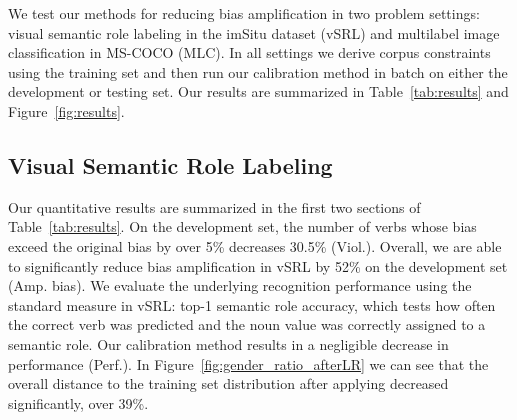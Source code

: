 We test our methods for reducing bias amplification in two problem settings: visual semantic role labeling in the imSitu dataset (vSRL) and multilabel image classification in MS-COCO (MLC). 
In all settings we derive corpus constraints using the training set and then run our calibration method in batch on either the development or testing set. 
Our results are summarized in Table~\ref{tab:results} and Figure~\ref{fig:results}.
\subsection{Visual Semantic Role Labeling}
Our quantitative results are summarized in the first two sections of Table~\ref{tab:results}.
On the development set, the number of verbs whose bias exceed the original bias by over 5\% decreases 30.5\% (Viol.).
Overall, we are able to significantly reduce bias amplification in vSRL by 52\% on the development set (Amp. bias).
We evaluate the underlying recognition performance using the standard measure in vSRL:  top-1 semantic role accuracy, which tests how often the correct verb was predicted and the noun value was correctly assigned to a semantic role.
Our calibration method results in a negligible decrease in performance (Perf.).
In Figure~\ref{fig:gender_ratio_afterLR} we can see that the overall distance to the training set distribution after applying \alg{} decreased significantly, over 39\%. 


